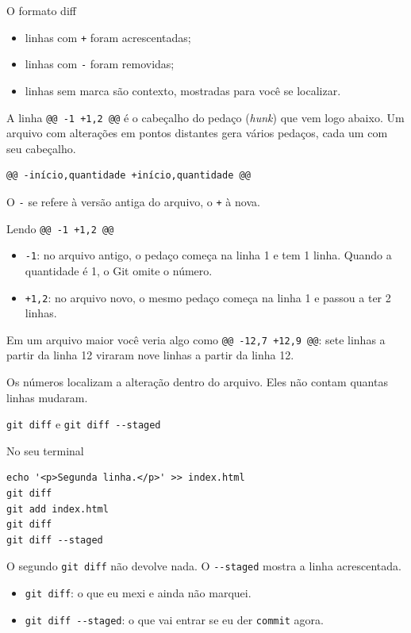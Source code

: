 \documentclass{beamer}
\newcommand{\ddash}{-\mbox{}-}
\newenvironment{noterminal}
  {\begin{exampleblock}{No seu terminal}}
  {\end{exampleblock}}
\begin{document}
\begin{frame}[fragile]{O formato diff}
  \begin{itemize}
    \item linhas com \texttt{+} foram acrescentadas;
    \item linhas com \texttt{-} foram removidas;
    \item linhas sem marca são contexto, mostradas para você se localizar.
  \end{itemize}

  \vspace{0.4cm}
  A linha \texttt{@@ -1 +1,2 @@} é o cabeçalho do pedaço (\textit{hunk}) que vem
  logo abaixo. Um arquivo com alterações em pontos distantes gera vários
  pedaços, cada um com seu cabeçalho.

  \begin{verbatim}
@@ -início,quantidade +início,quantidade @@
  \end{verbatim}

  O \texttt{-} se refere à versão antiga do arquivo, o \texttt{+} à nova.
\end{frame}

\begin{frame}[fragile]{Lendo \texttt{@@ -1 +1,2 @@}}
  \begin{itemize}
    \item \texttt{-1}: no arquivo antigo, o pedaço começa na linha 1 e tem 1
          linha. Quando a quantidade é 1, o Git omite o número.
    \item \texttt{+1,2}: no arquivo novo, o mesmo pedaço começa na linha 1 e
          passou a ter 2 linhas.
  \end{itemize}

  \vspace{0.4cm}
  Em um arquivo maior você veria algo como \texttt{@@ -12,7 +12,9 @@}: sete
  linhas a partir da linha 12 viraram nove linhas a partir da linha 12.

  \vspace{0.4cm}
  Os números localizam a alteração dentro do arquivo. Eles não contam quantas
  linhas mudaram.
\end{frame}

\begin{frame}[fragile]{\texttt{git diff} e \texttt{git diff \ddash staged}}
  \begin{noterminal}
    \begin{verbatim}
echo '<p>Segunda linha.</p>' >> index.html
git diff
git add index.html
git diff
git diff --staged
    \end{verbatim}
  \end{noterminal}

  O segundo \texttt{git diff} não devolve nada. O \texttt{\ddash staged} mostra a
  linha acrescentada.

  \begin{itemize}
    \item \texttt{git diff}: o que eu mexi e ainda não marquei.
    \item \texttt{git diff \ddash staged}: o que vai entrar se eu der
          \texttt{commit} agora.
  \end{itemize}
\end{frame}
\end{document}
